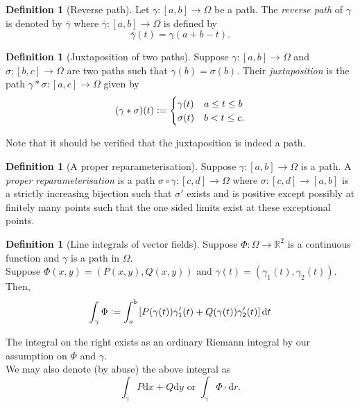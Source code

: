 \documentclass[12pt,oneside]{book}
\theoremstyle{definition}
\numberwithin{thm}{chapter}
\newtheorem{defn}[thm]{Definition}
\begin{document}
\begin{defn}[Reverse path]
	Let $\gamma:[a, b] \to \Omega$ be a path. The \emph{reverse path} of $\gamma$ is denoted by $\bar{\gamma}$ where $\bar{\gamma}:[a, b]\to \Omega$ is defined by
	\begin{equation*} 
		\bar{\gamma}(t) = \gamma(a + b - t).
	\end{equation*}
\end{defn}
\begin{defn}[Juxtaposition of two paths]
	Suppose $\gamma:[a, b] \to \Omega$ and $\sigma:[b, c] \to\Omega$ are two paths such that $\gamma(b) = \sigma(b)$. Their \emph{juxtaposition} is the path $\gamma*\sigma:[a, c] \to \Omega$ given by
	\begin{equation*} 
	 	(\gamma*\sigma)(t) \vcentcolon= \begin{cases}
	 		\gamma(t) & a \le t \le b\\
	 		\sigma(t) & b < t \le c.
	 	\end{cases}
	\end{equation*} 
\end{defn}
Note that it should be verified that the juxtaposition is indeed a path.

\begin{defn}[A proper reparameterisation]
	Suppose $\gamma:[a, b] \to \Omega$ is a path. A \emph{proper reparameterisation} is a path $\sigma\circ\gamma:[c, d] \to \Omega$ where $\sigma:[c, d] \to [a, b]$ is a strictly increasing bijection such that $\sigma'$ exists and is positive except possibly at finitely many points such that the one sided limits exist at these exceptional points.
\end{defn}

\begin{defn}[Line integrals of vector fields]
	Suppose $\Phi:\Omega\to\mathbb{R}^2$ is a continuous function and $\gamma$ is a path in $\Omega.$\\
	Suppose $\Phi(x, y) = (P(x, y), Q(x, y))$ and $\gamma(t) = (\gamma_1(t), \gamma_2(t)).$ Then,
	\begin{equation*} 
		\int_\gamma \Phi \vcentcolon= \int_{a}^{b} \left[P(\gamma(t))\gamma_1'(t) + Q(\gamma(t))\gamma_2'(t)\right] \mathrm{d}t
	\end{equation*}
\end{defn}
The integral on the right exists as an ordinary Riemann integral by our assumption on $\Phi$ and $\gamma.$\\
We may also denote (by abuse) the above integral as
\begin{equation*} 
	\int_\gamma P\mathrm{d}x + Q\mathrm{d}y \text{ or } \int_\gamma\Phi\cdot\mathrm{d}r.
\end{equation*}
\end{document}
